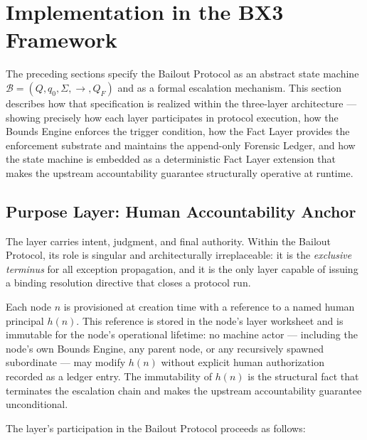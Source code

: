 \section{Implementation in the BX3 Framework}\label{sec:implementation}

The preceding sections specify the Bailout Protocol as an abstract state machine $\mathcal{B} = (Q, q_0, \Sigma, \rightarrow, Q_F)$ and as a formal escalation mechanism. This section describes how that specification is realized within the \bxthree{} three-layer architecture --- showing precisely how each layer participates in protocol execution, how the Bounds Engine enforces the trigger condition, how the Fact Layer provides the enforcement substrate and maintains the append-only Forensic Ledger, and how the state machine is embedded as a deterministic Fact Layer extension that makes the upstream accountability guarantee structurally operative at runtime.

\subsection{Purpose Layer: Human Accountability Anchor}\label{sec:purpose-layer}

The \purpose{} layer carries intent, judgment, and final authority. Within the Bailout Protocol, its role is singular and architecturally irreplaceable: it is the \emph{exclusive terminus} for all exception propagation, and it is the only layer capable of issuing a binding resolution directive that closes a protocol run.

Each \bxthree{} node $n$ is provisioned at creation time with a reference to a named human principal $h(n)$. This reference is stored in the node's \purpose{} layer worksheet and is immutable for the node's operational lifetime: no machine actor --- including the node's own Bounds Engine, any parent node, or any recursively spawned subordinate --- may modify $h(n)$ without explicit human authorization recorded as a ledger entry. The immutability of $h(n)$ is the structural fact that terminates the escalation chain and makes the upstream accountability guarantee unconditional.

The \purpose{} layer's participation in the Bailout Protocol proceeds as follows:

